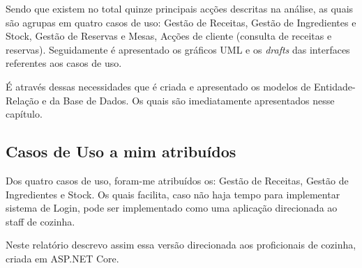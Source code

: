 Sendo que existem no total quinze principais acções descritas na análise, as quais são agrupas em quatro casos de uso: Gestão de Receitas, Gestão de Ingredientes e Stock, Gestão de Reservas e Mesas, Acções de cliente (consulta de receitas e reservas). Seguidamente é apresentado os gráficos UML e os \textit{drafts} das interfaces referentes aos casos de uso. 

É através dessas necessidades que é criada e apresentado os modelos de Entidade-Relação e da Base de Dados. Os quais são imediatamente apresentados nesse capítulo.

\subsection{Casos de Uso a mim atribuídos}

Dos quatro casos de uso, foram-me atribuídos os: Gestão de Receitas, Gestão de Ingredientes e Stock. Os quais facilita, caso não haja tempo para implementar sistema de Login, pode ser implementado como uma aplicação direcionada ao staff de cozinha.

Neste relatório descrevo assim essa versão direcionada aos proficionais de cozinha, criada em ASP.NET Core.